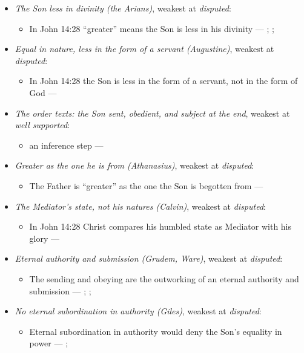 \documentclass[11pt,paper=\testimonypaper,DIV=13,parskip=false]{scrartcl}
\begin{document}
\begin{itemize}
\item \emph{The Son less in divinity (the Arians)}, weakest at \emph{disputed}:
\begin{itemize}
\item In John 14:28 “greater” means the Son is less in his divinity --- \cite[De Synodis 28]{schaff-nicene-post-nicene-fathers-2-4-1892}; \cite[On the Trinity I.7.14]{schaff-nicene-post-nicene-fathers-1-3-1887}; \cite[102]{calvin-commentary-john-2-1847}
\end{itemize}
\item \emph{Equal in nature, less in the form of a servant (Augustine)}, weakest at \emph{disputed}:
\begin{itemize}
\item In John 14:28 the Son is less in the form of a servant, not in the form of God --- \cite[On the Trinity I.7.14]{schaff-nicene-post-nicene-fathers-1-3-1887}
\end{itemize}
\item \emph{The order texts: the Son sent, obedient, and subject at the end}, weakest at \emph{well supported}:
\begin{itemize}
\item an inference step --- \cite[3, The Triune God]{kibbey-living-systematic-theology-2026}
\end{itemize}
\item \emph{Greater as the one he is from (Athanasius)}, weakest at \emph{disputed}:
\begin{itemize}
\item The Father is “greater” as the one the Son is begotten from --- \cite[Against the Arians I.13.58]{schaff-nicene-post-nicene-fathers-2-4-1892}
\end{itemize}
\item \emph{The Mediator’s state, not his natures (Calvin)}, weakest at \emph{disputed}:
\begin{itemize}
\item In John 14:28 Christ compares his humbled state as Mediator with his glory --- \cite[102--103]{calvin-commentary-john-2-1847}
\end{itemize}
\item \emph{Eternal authority and submission (Grudem, Ware)}, weakest at \emph{disputed}:
\begin{itemize}
\item The sending and obeying are the outworking of an eternal authority and submission --- \cite[40]{grudem-doctrinal-deviations-2015}; \cite{grudem-ets-trinity-2016}; \cite{ware-father-son-holy-spirit-2005}
\end{itemize}
\item \emph{No eternal subordination in authority (Giles)}, weakest at \emph{disputed}:
\begin{itemize}
\item Eternal subordination in authority would deny the Son’s equality in power --- \cite[323]{giles-ets-trinity-2008}; \cite{giles-jesus-and-the-father-2006}
\end{itemize}
\end{itemize}
\end{document}
